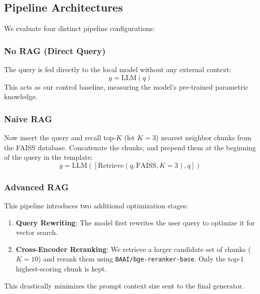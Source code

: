 \documentclass[conference]{IEEEtran}
\begin{document}
\subsection{Pipeline Architectures}
We evaluate four distinct pipeline configurations:
\subsubsection{No RAG (Direct Query)}
The query is fed directly to the local model without any external context:
\begin{equation}
y = \text{LLM}(q)
\end{equation}
This acts as our control baseline, measuring the model's pre-trained parametric knowledge.
\subsubsection{Naive RAG}
Now insert the query and recall top-$K$ (let $K=3$) nearest neighbor chunks from the FAISS database. Concatenate the chunks, and prepend them at the beginning of the query in the template:
\begin{equation}
y = \text{LLM}([\text{Retrieve}(q, \text{FAISS}, K=3), q])
\end{equation}
\subsubsection{Advanced RAG}
This pipeline introduces two additional optimization stages:
\begin{enumerate}
    \item \textbf{Query Rewriting}: The model first rewrites the user query to optimize it for vector search.
    \item \textbf{Cross-Encoder Reranking}: We retrieve a larger candidate set of chunks ($K=10$) and rerank them using \texttt{BAAI/bge-reranker-base}. Only the top-$1$ highest-scoring chunk is kept.
\end{enumerate}
This drastically minimizes the prompt context size sent to the final generator.
\end{document}
